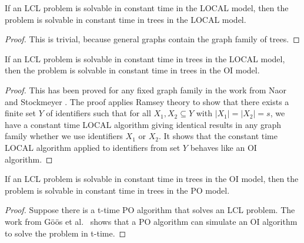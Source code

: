 \begin{lemma} \label{lem:algorithm:from_pn_to_local:o1_local_gen_imply_o1_local_trees}
    If an LCL problem is solvable in constant time in the LOCAL model, then the problem is solvable in constant time in trees in the LOCAL model.
\end{lemma}
\begin{proof}
    This is trivial, because general graphs contain the graph family of trees.
\end{proof}

\begin{lemma} \label{lem:algorithm:from_pn_to_local:o1_local_trees_imply_o1_oi_trees}
    If an LCL problem is solvable in constant time in trees in the LOCAL model, then the problem is solvable in constant time in trees in the OI model.
\end{lemma}
\begin{proof}
    This has been proved for any fixed graph family in the work from Naor and Stockmeyer \cite[theorem 3.3]{DBLP:journals/siamcomp/NaorS95}.
    The proof applies Ramsey theory to show that there exists a finite set $Y$ of identifiers such that for all $X_1, X_2 \subseteq Y$ with $|X_1| = |X_2| = s$, we have a constant time LOCAL algorithm giving identical results in any graph family whether we use identifiers $X_1$ or $X_2$.
    It shows that the constant time LOCAL algorithm applied to identifiers from set $Y$ behaves like an OI algorithm.
\end{proof}

\begin{lemma} \label{lem:algorithm:from_pn_to_local:o1_oi_trees_imply_o1_po_trees}
    If an LCL problem is solvable in constant time in trees in the OI model, then the problem is solvable in constant time in trees in the PO model.
\end{lemma}
\begin{proof}
    Suppose there is a t-time PO algorithm that solves an LCL problem.
    The work from Göös et al.~\cite{DBLP:journals/dc/GoosHS17} shows that a PO algorithm can simulate an OI algorithm to solve the problem in t-time.
\end{proof}

